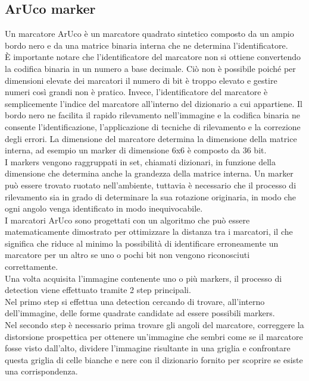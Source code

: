 \subsection{ArUco marker}
Un marcatore ArUco \cite{ArUco} è un marcatore quadrato sintetico composto da un ampio bordo nero e da una matrice binaria interna che ne determina l'identificatore.\\ 
\`E importante notare che l'identificatore del marcatore non si ottiene convertendo la codifica binaria in un numero a base decimale. Ciò non è possibile poiché per dimensioni elevate dei marcatori il numero di bit è troppo elevato e gestire numeri così grandi non è pratico. Invece, l'identificatore del marcatore è semplicemente l'indice del marcatore all'interno del dizionario a cui appartiene.
Il bordo nero ne facilita il rapido rilevamento nell'immagine e la codifica binaria ne consente l'identificazione, l'applicazione di tecniche di rilevamento e la correzione degli errori. La dimensione del marcatore determina la dimensione della matrice interna, ad esempio un marker di dimensione 6x6 è composto da 36 bit.\\
I markers vengono raggruppati in set, chiamati dizionari, in funzione della dimensione che determina anche la grandezza della matrice interna. 
Un marker può essere trovato ruotato nell'ambiente, tuttavia è necessario che il processo di rilevamento sia in grado di determinare la sua rotazione originaria, in modo che ogni angolo venga identificato in modo inequivocabile.\\
I marcatori ArUco sono progettati con un algoritmo che può essere matematicamente dimostrato per ottimizzare la distanza tra i marcatori, il che significa che riduce al minimo la possibilità di identificare erroneamente un marcatore per un altro se uno o pochi bit non vengono riconosciuti correttamente.\\
Una volta acquisita l’immagine contenente uno o più markers, il processo di detection viene effettuato tramite 2 step principali. \\
Nel primo step si effettua una detection cercando di trovare, all’interno dell’immagine, delle forme quadrate candidate ad essere possibili markers.\\ 
Nel secondo step è necessario prima trovare gli angoli del marcatore, correggere la distorsione prospettica per ottenere un'immagine che sembri come se il marcatore fosse visto dall'alto, dividere l'immagine risultante in una griglia e confrontare questa griglia di celle bianche e nere con il dizionario fornito per scoprire se esiste una corrispondenza.
